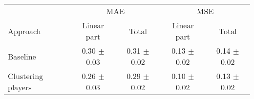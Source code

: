    \begin{tabular}{l c c c c }
    \toprule
    
    & \multicolumn{2}{c}{MAE} & \multicolumn{2}{c}{MSE} \\
    \cmidrule(r){2-3} 
    \cmidrule(r){4-5}

    Approach & Linear part & Total & Linear part & Total  \\
    \midrule
    Baseline            & 0.30 $\pm$ 0.03 & 0.31 $\pm$ 0.02 & 0.13 $\pm$ 0.02 & 0.14 $\pm$ 0.02   \\ %
    Clustering players  & 0.26 $\pm$ 0.03 & 0.29 $\pm$ 0.02 & 0.10 $\pm$ 0.02 & 0.13 $\pm$ 0.02 \\  %
    
    \bottomrule
    \end{tabular}